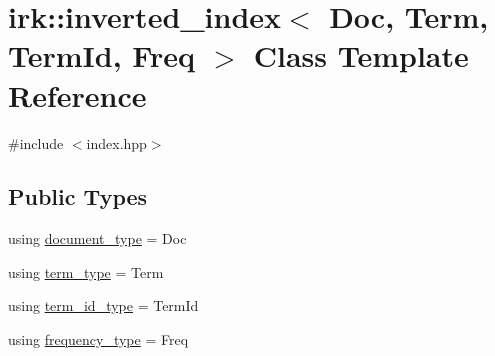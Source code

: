 \hypertarget{classirk_1_1inverted__index}{}\section{irk\+:\+:inverted\+\_\+index$<$ Doc, Term, Term\+Id, Freq $>$ Class Template Reference}
\label{classirk_1_1inverted__index}


{\ttfamily \#include $<$index.\+hpp$>$}

\subsection*{Public Types}
\begin{DoxyCompactItemize}
\item 
using \mbox{\hyperlink{classirk_1_1inverted__index_ab708a9d1605de705341f3ed81bd7d5e7}{document\+\_\+type}} = Doc
\item 
using \mbox{\hyperlink{classirk_1_1inverted__index_a7a60c2cec1774c08f21e8e27ccb5ac33}{term\+\_\+type}} = Term
\item 
using \mbox{\hyperlink{classirk_1_1inverted__index_aac7579f5261c795a6f19a7f700b57b2b}{term\+\_\+id\+\_\+type}} = Term\+Id
\item 
using \mbox{\hyperlink{classirk_1_1inverted__index_a549e531087ca14fc58742608cc8fe2e7}{frequency\+\_\+type}} = Freq
\end{DoxyCompactItemize}
